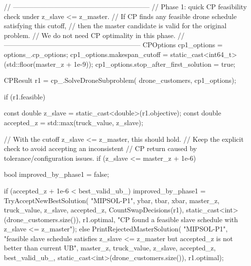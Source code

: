 {{{{                // ------------------------------------------------------------
                // Phase 1: quick CP feasibility check under z_slave <= z_master.
                // If CP finds any feasible drone schedule satisfying this cutoff,
                // then the master candidate is valid for the original problem.
                // We do not need CP optimality in this phase.
                // ------------------------------------------------------------
                CPOptions cp1_options = options_.cp_options;
                cp1_options.makespan_cutoff =
                    static_cast<int64_t>(std::floor(master_z + 1e-9));
                cp1_options.stop_after_first_solution = true;

                CPResult r1 = cp_.SolveDroneSubproblem(
                    drone_customers,
                    cp1_options);

                if (r1.feasible)
                {
                    const double z_slave = static_cast<double>(r1.objective);
                    const double accepted_z = std::max(truck_value, z_slave);

                    // With the cutoff z_slave <= z_master, this should hold.
                    // Keep the explicit check to avoid accepting an inconsistent
                    // CP return caused by tolerance/configuration issues.
                    if (z_slave <= master_z + 1e-6)
                    {
                        bool improved_by_phase1 = false;

                        if (accepted_z + 1e-6 < best_valid_ub_)
                        {
                            improved_by_phase1 = TryAcceptNewBestSolution(
                                "MIPSOL-P1",
                                ybar,
                                tbar,
                                xbar,
                                master_z,
                                truck_value,
                                z_slave,
                                accepted_z,
                                CountSwapDecisions(r1),
                                static_cast<int>(drone_customers.size()),
                                r1.optimal,
                                "CP found a feasible slave schedule with z_slave <= z_master");
                        }
                        else
                        {
                            PrintRejectedMasterSolution(
                                "MIPSOL-P1",
                                "feasible slave schedule satisfies z_slave <= z_master but accepted_z is not better than current UB",
                                master_z,
                                truck_value,
                                z_slave,
                                accepted_z,
                                best_valid_ub_,
                                static_cast<int>(drone_customers.size()),
                                r1.optimal);
                        }

}}}}}}
